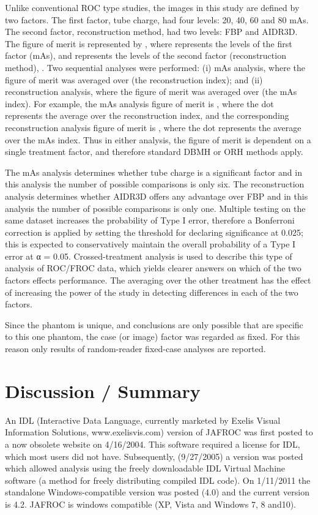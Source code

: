 \documentclass[
]{book}
\begin{document}
Unlike conventional ROC type studies, the images in this study are defined by two factors. The first factor, tube charge, had four levels: 20, 40, 60 and 80 mAs. The second factor, reconstruction method, had two levels: FBP and AIDR3D. The figure of merit is represented by , where represents the levels of the first factor (mAs), and represents the levels of the second factor (reconstruction method), . Two sequential analyses were performed: (i) mAs analysis, where the figure of merit was averaged over (the reconstruction index); and (ii) reconstruction analysis, where the figure of merit was averaged over (the mAs index). For example, the mAs analysis figure of merit is , where the dot represents the average over the reconstruction index, and the corresponding reconstruction analysis figure of merit is , where the dot represents the average over the mAs index. Thus in either analysis, the figure of merit is dependent on a single treatment factor, and therefore standard DBMH or ORH methods apply.

The mAs analysis determines whether tube charge is a significant factor and in this analysis the number of possible comparisons is only six. The reconstruction analysis determines whether AIDR3D offers any advantage over FBP and in this analysis the number of possible comparisons is only one. Multiple testing on the same dataset increases the probability of Type I error, therefore a Bonferroni correction is applied by setting the threshold for declaring significance at 0.025; this is expected to conservatively maintain the overall probability of a Type I error at α = 0.05. Crossed-treatment analysis is used to describe this type of analysis of ROC/FROC data, which yields clearer answers on which of the two factors effects performance. The averaging over the other treatment has the effect of increasing the power of the study in detecting differences in each of the two factors.

Since the phantom is unique, and conclusions are only possible that are specific to this one phantom, the case (or image) factor was regarded as fixed. For this reason only results of random-reader fixed-case analyses are reported.

\hypertarget{analyzing-froc-data-rjafroc-history}{%
\section{Discussion / Summary}\label{analyzing-froc-data-rjafroc-history}}

An IDL (Interactive Data Language, currently marketed by Exelis Visual Information Solutions, www.exelisvis.com) version of JAFROC was first posted to a now obsolete website on 4/16/2004. This software required a license for IDL, which most users did not have. Subsequently, (9/27/2005) a version was posted which allowed analysis using the freely downloadable IDL Virtual Machine software (a method for freely distributing compiled IDL code). On 1/11/2011 the standalone Windows-compatible version was posted (4.0) and the current version is 4.2. JAFROC is windows compatible (XP, Vista and Windows 7, 8 and10).
\end{document}
